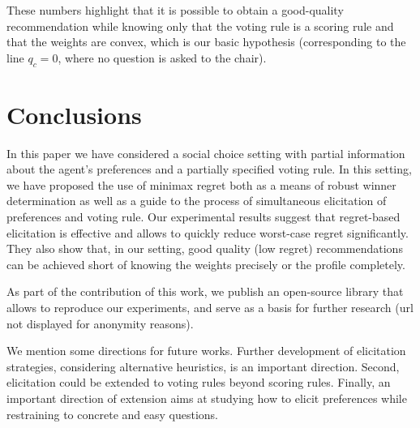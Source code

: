 \documentclass{article}
\begin{document}
These numbers highlight that it is possible to obtain a good-quality recommendation while knowing only that the voting rule is a scoring rule and that the weights are convex, which is our basic hypothesis (corresponding to the line $q_c = 0$, where no question is asked to the chair).

\section{Conclusions}  
\label{sec:conclusions}
In this paper we have considered a social choice setting with partial information about the agent's preferences and a partially specified voting rule.
In this setting, we have proposed the use of minimax regret both as a means of robust winner determination as well as a guide to the process of simultaneous elicitation of preferences and voting rule.
Our experimental results %
suggest that regret-based elicitation is effective and allows to quickly reduce worst-case regret significantly. They also show that, in our setting, good quality (low regret) recommendations can be achieved short of knowing the weights precisely or the profile completely.

As part of the contribution of this work, we publish an open-source library that allows to reproduce our experiments, and serve as a basis for further research (url not displayed for anonymity reasons).

We mention some directions for future works.
Further development of elicitation strategies, considering alternative heuristics, is an important direction. 
Second, elicitation could be extended to voting rules beyond scoring rules. 
Finally, an important direction of extension aims at studying how to elicit preferences while restraining to concrete and easy questions.

\end{document}
